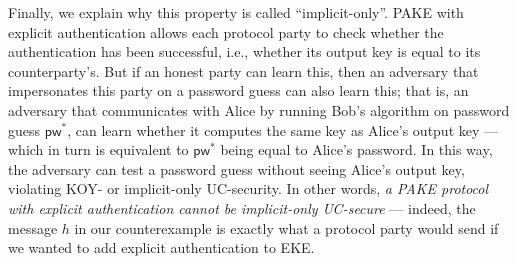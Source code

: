 \documentclass{article}
\newcommand{\pw}{\mathsf{pw}}
\begin{document}
Finally, we explain why this property is called ``implicit-only''. PAKE with explicit authentication allows each protocol party to check whether the authentication has been successful, i.e., whether its output key is equal to its counterparty's. But if an honest party can learn this, then an adversary that impersonates this party on a password guess can also learn this; that is, an adversary that communicates with Alice by running Bob's algorithm on password guess $\pw^*$, can learn whether it computes the same key as Alice's output key --- which in turn is equivalent to $\pw^*$ being equal to Alice's password. In this way, the adversary can test a password guess without seeing Alice's output key, violating KOY- or implicit-only UC-security. In other words, \emph{a PAKE protocol with explicit authentication cannot be implicit-only UC-secure} --- indeed, the message $h$ in our counterexample is exactly what a protocol party would send if we wanted to add explicit authentication to EKE.



\end{document}
